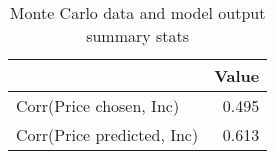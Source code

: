 \begin{table}[!ht]
	\centering
		\caption{Monte Carlo data and model output summary stats}
\begin{tabular}{lr}
		\toprule
               &     Value\\
		\midrule
		Corr(Price chosen, Inc)&     0.495\\
		Corr(Price predicted, Inc)&     0.613\\
		\bottomrule
	\end{tabular}
\end{table}
